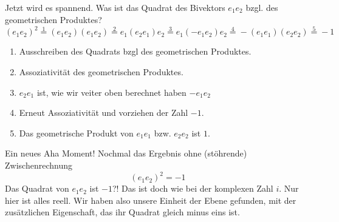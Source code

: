 \documentclass[fleqn]{scrartcl}
\numberwithin{equation}{section}
\begin{document}
\begin{center}
\begin{minipage}{\linewidth}
\centering
{}
\label{fig:orientationPlane2}
\end{minipage}
\end{center}
Jetzt wird es spannend. Was ist das Quadrat des Bivektors $e_1e_2$ bzgl. des
geometrischen Produktes?
\[(e_1e_2)^2\stackrel{1}=(e_1e_2)(e_1e_2)\stackrel{2}=e_1(e_2e_1)e_2\stackrel{3}=e_1(-e_1e_2)e_2\stackrel{4}=-(e_1e_1)(e_2e_2)\stackrel{5}=-1\]
\begin{enumerate}
    \item Ausschreiben des Quadrats bzgl des geometrischen Produktes.
    \item Assoziativität des geometrischen Produktes.
    \item $e_2e_1$ ist, wie wir veiter oben berechnet haben $-e_1e_2$
    \item Erneut Assoziativität und vorziehen der Zahl $-1$.
    \item Das geometrische Produkt von $e_1e_1$ bzw. $e_2e_2$ ist $1$.
\end{enumerate}
Ein neues Aha Moment! Nochmal das Ergebnis ohne (stöhrende) Zwischenrechnung
\[(e_1e_2)^2=-1\]
Das Quadrat von $e_1e_2$ ist $-1$?! Das ist doch wie bei der komplexen Zahl
$i$. Nur hier ist alles reell. Wir haben also unsere Einheit der Ebene
gefunden, mit der zusätzlichen Eigenschaft, das ihr Quadrat gleich minus eins
ist.
\end{document}

